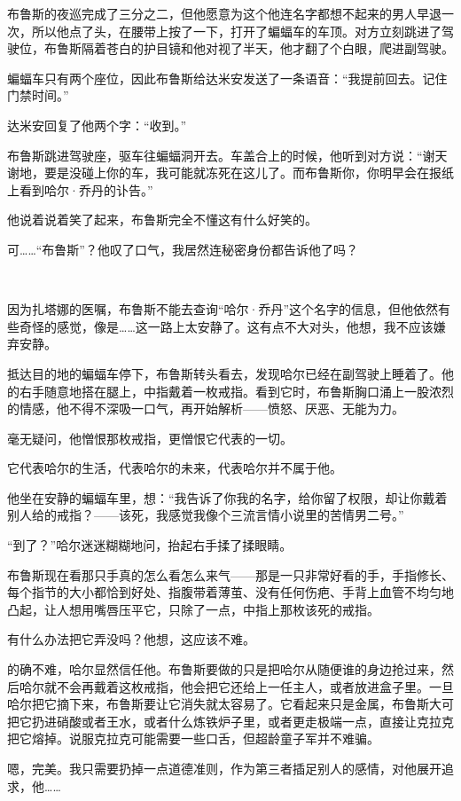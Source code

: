 \documentclass[../main.tex]{subfiles}
\begin{document}
布鲁斯的夜巡完成了三分之二，但他愿意为这个他连名字都想不起来的男人早退一次，所以他点了头，在腰带上按了一下，打开了蝙蝠车的车顶。对方立刻跳进了驾驶位，布鲁斯隔着苍白的护目镜和他对视了半天，他才翻了个白眼，爬进副驾驶。

蝙蝠车只有两个座位，因此布鲁斯给达米安发送了一条语音：“我提前回去。记住门禁时间。”

达米安回复了他两个字：“收到。”

布鲁斯跳进驾驶座，驱车往蝙蝠洞开去。车盖合上的时候，他听到对方说：“谢天谢地，要是没碰上你的车，我可能就冻死在这儿了。而布鲁斯你，你明早会在报纸上看到哈尔·乔丹的讣告。”

他说着说着笑了起来，布鲁斯完全不懂这有什么好笑的。

可……“布鲁斯”？他叹了口气，我居然连秘密身份都告诉他了吗？

~\

因为扎塔娜的医嘱，布鲁斯不能去查询“哈尔·乔丹”这个名字的信息，但他依然有些奇怪的感觉，像是……这一路上太安静了。这有点不大对头，他想，我不应该嫌弃安静。

抵达目的地的蝙蝠车停下，布鲁斯转头看去，发现哈尔已经在副驾驶上睡着了。他的右手随意地搭在腿上，中指戴着一枚戒指。看到它时，布鲁斯胸口涌上一股浓烈的情感，他不得不深吸一口气，再开始解析——愤怒、厌恶、无能为力。

毫无疑问，他憎恨那枚戒指，更憎恨它代表的一切。

它代表哈尔的生活，代表哈尔的未来，代表哈尔并不属于他。

他坐在安静的蝙蝠车里，想：“我告诉了你我的名字，给你留了权限，却让你戴着别人给的戒指？——该死，我感觉我像个三流言情小说里的苦情男二号。”

“到了？”哈尔迷迷糊糊地问，抬起右手揉了揉眼睛。

布鲁斯现在看那只手真的怎么看怎么来气——那是一只非常好看的手，手指修长、每个指节的大小都恰到好处、指腹带着薄茧、没有任何伤疤、手背上血管不均匀地凸起，让人想用嘴唇压平它，只除了一点，中指上那枚该死的戒指。

有什么办法把它弄没吗？他想，这应该不难。

的确不难，哈尔显然信任他。布鲁斯要做的只是把哈尔从随便谁的身边抢过来，然后哈尔就不会再戴着这枚戒指，他会把它还给上一任主人，或者放进盒子里。一旦哈尔把它摘下来，布鲁斯要让它消失就太容易了。它看起来只是金属，布鲁斯大可把它扔进硝酸或者王水，或者什么炼铁炉子里，或者更走极端一点，直接让克拉克把它熔掉。说服克拉克可能需要一些口舌，但超龄童子军并不难骗。

嗯，完美。我只需要扔掉一点道德准则，作为第三者插足别人的感情，对他展开追求，他……
\end{document}
